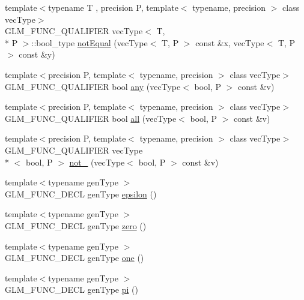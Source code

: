 \begin{DoxyCompactItemize}
\item 
{\footnotesize template$<$typename T , precision P, template$<$ typename, precision $>$ class vec\-Type$>$ }\\G\-L\-M\-\_\-\-F\-U\-N\-C\-\_\-\-Q\-U\-A\-L\-I\-F\-I\-E\-R vec\-Type$<$ T, \\*
P $>$\-::bool\-\_\-type \hyperlink{group__core__func__vector__relational_ga85d7bc5613c4dcc2d5873ec9d6ed4c19}{not\-Equal} (vec\-Type$<$ T, P $>$ const \&x, vec\-Type$<$ T, P $>$ const \&y)
\item 
{\footnotesize template$<$precision P, template$<$ typename, precision $>$ class vec\-Type$>$ }\\G\-L\-M\-\_\-\-F\-U\-N\-C\-\_\-\-Q\-U\-A\-L\-I\-F\-I\-E\-R bool \hyperlink{group__core__func__vector__relational_ga632a2644532d9332011c8860400d30b2}{any} (vec\-Type$<$ bool, P $>$ const \&v)
\item 
{\footnotesize template$<$precision P, template$<$ typename, precision $>$ class vec\-Type$>$ }\\G\-L\-M\-\_\-\-F\-U\-N\-C\-\_\-\-Q\-U\-A\-L\-I\-F\-I\-E\-R bool \hyperlink{group__core__func__vector__relational_ga14bbc94f2ae2774a1d64d91f8767773e}{all} (vec\-Type$<$ bool, P $>$ const \&v)
\item 
{\footnotesize template$<$precision P, template$<$ typename, precision $>$ class vec\-Type$>$ }\\G\-L\-M\-\_\-\-F\-U\-N\-C\-\_\-\-Q\-U\-A\-L\-I\-F\-I\-E\-R vec\-Type\\*
$<$ bool, P $>$ \hyperlink{group__core__func__vector__relational_ga4329ecbc2ef012c9ec704bd09da1f177}{not\-\_\-} (vec\-Type$<$ bool, P $>$ const \&v)
\item 
{\footnotesize template$<$typename gen\-Type $>$ }\\G\-L\-M\-\_\-\-F\-U\-N\-C\-\_\-\-D\-E\-C\-L gen\-Type \hyperlink{group__gtc__constants_gacb41049b8d22c8aa90e362b96c524feb}{epsilon} ()
\item 
{\footnotesize template$<$typename gen\-Type $>$ }\\G\-L\-M\-\_\-\-F\-U\-N\-C\-\_\-\-D\-E\-C\-L gen\-Type \hyperlink{group__gtc__constants_ga5cc97dd01d37fc199264ff6030578435}{zero} ()
\item 
{\footnotesize template$<$typename gen\-Type $>$ }\\G\-L\-M\-\_\-\-F\-U\-N\-C\-\_\-\-D\-E\-C\-L gen\-Type \hyperlink{group__gtc__constants_ga8186ec2c330457d41d9686c47cd3b2d1}{one} ()
\item 
{\footnotesize template$<$typename gen\-Type $>$ }\\G\-L\-M\-\_\-\-F\-U\-N\-C\-\_\-\-D\-E\-C\-L gen\-Type \hyperlink{group__gtc__constants_gae671930537266a9a650ccb4b88757692}{pi} ()

\end{DoxyCompactItemize}
